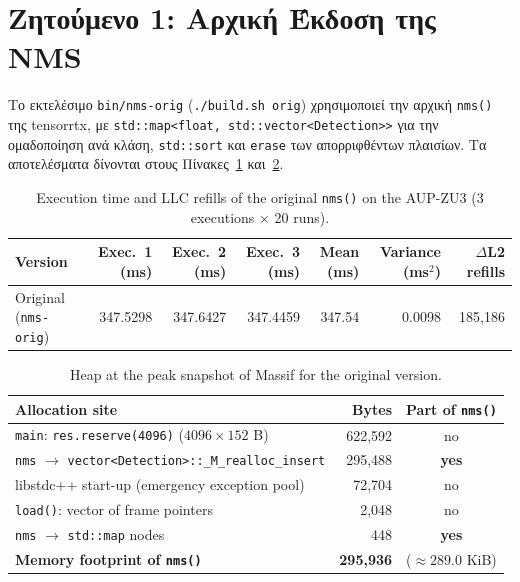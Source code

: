 \documentclass[11pt,a4paper]{article}
\newcommand{\en}[1]{\textlatin{#1}}
\begin{document}
\section{Ζητούμενο 1: Αρχική Έκδοση της \en{NMS}}
Το εκτελέσιμο \en{\texttt{bin/nms-orig}} (\en{\texttt{./build.sh orig}}) χρησιμοποιεί την αρχική \en{\texttt{nms()}} της \en{tensorrtx}, με \en{\texttt{std::map<float, std::vector<Detection>>}} για την ομαδοποίηση ανά κλάση, \en{\texttt{std::sort}} και \en{\texttt{erase}} των απορριφθέντων πλαισίων. Τα αποτελέσματα δίνονται στους Πίνακες~\ref{tab:q1_time} και~\ref{tab:q1_mem}.

\begin{table}[H]
\centering
\caption{Execution time and LLC refills of the original \texttt{nms()} on the AUP-ZU3 (3 executions $\times$ 20 runs).}
\label{tab:q1_time}
\begin{tabular}{@{}lrrrrrr@{}}
\toprule
Version & Exec.~1 (ms) & Exec.~2 (ms) & Exec.~3 (ms) & Mean (ms) & Variance (ms$^2$) & $\Delta$L2 refills \\
\midrule
Original (\texttt{nms-orig}) & 347.5298 & 347.6427 & 347.4459 & 347.54 & 0.0098 & 185{,}186 \\
\bottomrule
\end{tabular}
\end{table}

\begin{table}[H]
\centering
\caption{Heap at the peak snapshot of Massif for the original version.}
\label{tab:q1_mem}
\begin{tabular}{@{}lrc@{}}
\toprule
Allocation site & Bytes & Part of \texttt{nms()} \\
\midrule
\texttt{main}: \texttt{res.reserve(4096)} ($4096 \times 152$ B) & 622{,}592 & no \\
\texttt{nms} $\rightarrow$ \texttt{vector<Detection>::\_M\_realloc\_insert} & 295{,}488 & \textbf{yes} \\
libstdc++ start-up (emergency exception pool) & 72{,}704 & no \\
\texttt{load()}: vector of frame pointers & 2{,}048 & no \\
\texttt{nms} $\rightarrow$ \texttt{std::map} nodes & 448 & \textbf{yes} \\
\midrule
\textbf{Memory footprint of \texttt{nms()}} & \textbf{295{,}936} & ($\approx 289.0$ KiB) \\
\bottomrule
\end{tabular}
\end{table}
\end{document}
